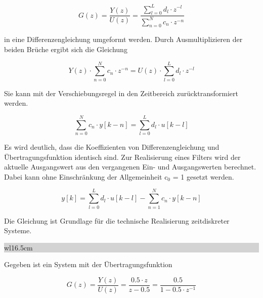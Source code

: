\begin{equation}\label{eq:sixtwentyfour}
G\left(z\right)=\frac{Y\left(z\right)}{U\left(z\right)} =\frac{\sum _{l=0}^{L}d_{l} \cdot z^{-l}  }{\sum _{n=0}^{N}c_{n} \cdot z^{-n}}
\end{equation}

\noindent in eine Differenzengleichung umgeformt werden. Durch Ausmultiplizieren der beiden Br\"{u}che ergibt sich die Gleichung

\begin{equation}\label{eq:sixtwentyfive}
Y\left(z\right)\cdot \sum _{n=0}^{N}c_{n} \cdot z^{-n}  =U\left(z\right)\cdot \sum _{l=0}^{L}d_{l} \cdot z^{-l}
\end{equation}

\noindent Sie kann mit der Verschiebungsregel in den Zeitbereich zur\"{u}cktransformiert werden.

\begin{equation}\label{eq:sixtwentysix}
\sum _{n=0}^{N}c_{n} \cdot y\left[k-n\right] =\sum _{l=0}^{L}d_{l} \cdot u\left[k-l\right]
\end{equation}

\noindent Es wird deutlich, dass die Koeffizienten von Differenzengleichung und \"{U}bertragungsfunktion identisch sind. Zur Realisierung eines Filters wird der aktuelle Ausgangswert aus den vergangenen Ein- und Ausgangswerten berechnet. Dabei kann ohne Einschr\"{a}nkung der Allgemeinheit c${}_{0}$ = 1 gesetzt werden.

\begin{equation}\label{eq:sixtwentyseven}
y\left[k\right]=\sum _{l=0}^{L}d_{l} \cdot u\left[k-l\right] -\sum _{n=1}^{N}c_{n} \cdot y\left[k-n\right]
\end{equation}

\noindent Die Gleichung ist Grundlage f\"{u}r die technische Realisierung zeitdiskreter Systeme.\bigskip

\noindent
\colorbox{lightgray}{%
%
\renewcommand\arraystretch{0.6}%
\begin{tabular}{ wl{16.5cm} }
{\selectfont{Beispiel: Systemrealisierung}}
\end{tabular}%
}\medskip

\noindent Gegeben ist ein System mit der \"{U}bertragungsfunktion 

\begin{equation}\label{eq:sixtwentyeight}
G\left(z\right)=\frac{Y\left(z\right)}{U\left(z\right)} =\frac{0.5\cdot z}{z-0.5} =\frac{0.5}{1-0.5\cdot z^{-1} }
\end{equation}

